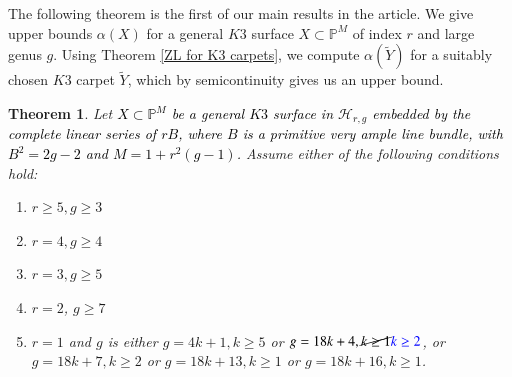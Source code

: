 \documentclass[11pt,twoside]{amsart}
\theoremstyle{plain}
\numberwithin{equation}{section}
\newtheorem{theorem}{Theorem}[section]
\theoremstyle{definition}
\begin{document}
The following theorem is the first of our main results in the article. We give upper bounds $\alpha(X)$ for a general $K3$ surface $X \subset \mathbb{P}^M$ of index $r$ and large genus $g$. Using Theorem \ref{ZL for K3 carpets}, we compute $\alpha(\widetilde{Y})$ for a suitably chosen $K3$ carpet $\widetilde{Y}$, which by semicontinuity gives us an upper bound. 


\begin{theorem}\label{non-extendability of K3 surfaces}
    Let \textcolor{black}{$X \subset \mathbb{P}^{M}$ be a general $K3$ surface in $\mathcal{H}_{r,g}$ embedded by the complete linear series of $rB$, where $B$ is a primitive very ample line bundle, with $B^2 = 2g-2$ and $M = 1+r^2(g-1)$.} Assume either of the following conditions hold:
    \begin{enumerate}
        \item[(1)] $r \geq 5, g \geq 3$
        \item[(2)] $r = 4, g \geq 4$
        \item[(3)] $r = 3, g \geq 5$ 
        \item[(4)] $r = 2$, $g \geq 7$ 
        \item[(5)] $r = 1$ and $g$ is either $g = 4k+1, k \geq 5$ or $g = 18k+4, \cancel{k \geq 1} \textcolor{blue}{k \geq 2
        }$, or $g = 18k+7, k \geq 2$ or $g = 18k+13, k \geq 1$ or $g = 18k+16, k \geq 1$.
        
        
        
        
    \end{enumerate}
\end{theorem}
\end{document}

